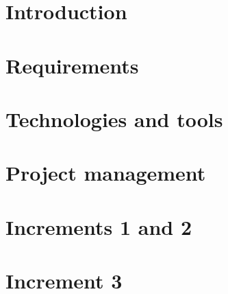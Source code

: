 \documentclass[12pt,twoside,a4paper]{book}
\begin{document}


\cleardoublepage



\cleardoublepage
\pagestyle{plain}
\tableofcontents
\listoffigures
\listoftables



\cleardoublepage
{}
\setcounter{page}{1}
\pagestyle{headings}
\chapter{Introduction}


\cleardoublepage
\chapter{Requirements}


\cleardoublepage
\chapter{Technologies and tools}




\cleardoublepage
\chapter{Project management}







\cleardoublepage
\chapter{Increments 1 and 2}


\cleardoublepage
\chapter{Increment 3}

\end{document}
